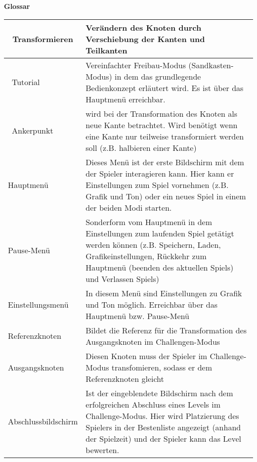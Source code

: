 \documentclass[10pt]{article}
\begin{document}
\newpage
\textbf{Glossar} \\
\begin{tabular}{|p{}|p{}|}
\hline 
\ Transformieren & Verändern des Knoten durch Verschiebung der Kanten und Teilkanten\\
\hline 
\ Tutorial & Vereinfachter Freibau-Modus (Sandkasten-Modus)  in dem das grundlegende Bedienkonzept erläutert wird. Es ist über das Hauptmenü erreichbar.\\
\hline 
\ Ankerpunkt & wird bei der Transformation des Knoten als neue Kante betrachtet. Wird benötigt wenn eine Kante nur teilweise transformiert werden soll (z.B. halbieren einer Kante)\\ 
\hline 
Hauptmenü & Dieses Menü ist der erste Bildschirm mit dem der Spieler interagieren kann. Hier kann er Einstellungen zum Spiel vornehmen (z.B. Grafik und Ton) oder ein neues Spiel in einem der beiden Modi starten. \\ 
\hline 
Pause-Menü & Sonderform vom Hauptmenü in dem Einstellungen zum laufenden Spiel getätigt werden können (z.B. Speichern, Laden, Grafikeinstellungen, Rückkehr zum Hauptmenü (beenden des aktuellen Spiels) und Verlassen Spiels) \\ 
\hline 
Einstellungsmenü & In diesem Menü sind Einstellungen zu Grafik und Ton möglich. Erreichbar über das Hauptmenü bzw. Pause-Menü \\ 
\hline 
Referenzknoten & Bildet die Referenz für die Transformation des Ausgangsknoten im Challengen-Modus\\ 
\hline 
Ausgangsknoten & Diesen Knoten muss der Spieler im Challenge-Modus transfomieren, sodass er dem Referenzknoten gleicht \\ 
\hline 
Abschlussbildschirm & Ist der eingeblendete Bildschirm nach dem erfolgreichen Abschluss eines Levels im Challenge-Modus. Hier wird Platzierung des Spielers in der Bestenliste angezeigt (anhand der Spielzeit) und der Spieler kann das Level bewerten.\\ 
\hline 


\end{tabular} 
\end{document}
